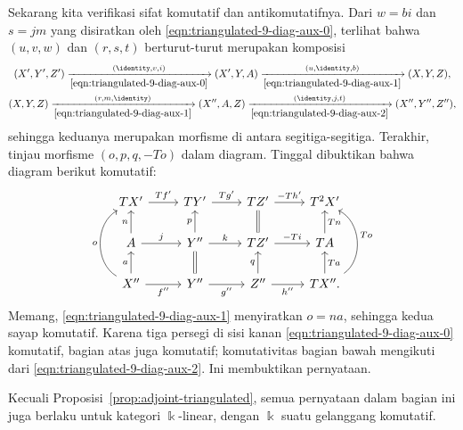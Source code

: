 \begin{bukti}
	Sekarang kita verifikasi sifat komutatif dan antikomutatifnya. Dari $w = bi$
	dan $s = jm$ yang disiratkan oleh
	\eqref{eqn:triangulated-9-diag-aux-0}, terlihat bahwa $(u, v, w)$ dan
	$(r, s, t)$ berturut-turut merupakan komposisi
	\begin{gather*}
		(X', Y', Z') \xrightarrow[\eqref{eqn:triangulated-9-diag-aux-0}]{(\identity, v, i)} (X', Y, A) \xrightarrow[\eqref{eqn:triangulated-9-diag-aux-1}]{(u, \identity, b)} (X, Y, Z), \\
		(X, Y, Z) \xrightarrow[\eqref{eqn:triangulated-9-diag-aux-1}]{(r, m, \identity)} (X'', A, Z) \xrightarrow[\eqref{eqn:triangulated-9-diag-aux-2}]{(\identity, j, t)} (X'', Y'', Z''),
	\end{gather*}
	sehingga keduanya merupakan morfisme di antara segitiga-segitiga. Terakhir,
	tinjau morfisme $(o, p, q, -To)$ dalam diagram. Tinggal dibuktikan bahwa
	diagram berikut komutatif:
	\[\begin{tikzcd}
		TX' \arrow[r, "{Tf'}"] & TY' \arrow[r, "{Tg'}"] & TZ' \arrow[r, "{- Th'}"] & T^2 X' \\
		A \arrow[u, "n"] \arrow[r, "j"] & Y'' \arrow[r, "k"] \arrow[u, "p"] & TZ' \arrow[equal, u] \arrow[r, "-Ti"] & TA \arrow[u, "Tn"'] \\
		X'' \arrow[u, "a"] \arrow[r, "{f''}"'] \arrow[bend left=60, uu, "o"] & Y'' \arrow[r, "{g''}"'] \arrow[equal, u] & Z'' \arrow[r, "{h''}"'] \arrow[u, "q"] & TX'' \arrow[u, "Ta"'] \arrow[bend right=60, uu, "To"'] .
	\end{tikzcd}\]
	Memang, \eqref{eqn:triangulated-9-diag-aux-1} menyiratkan $o = na$, sehingga
	kedua sayap komutatif. Karena tiga persegi di sisi kanan
	\eqref{eqn:triangulated-9-diag-aux-0} komutatif, bagian atas juga
	komutatif; komutativitas bagian bawah mengikuti dari
	\eqref{eqn:triangulated-9-diag-aux-2}. Ini membuktikan pernyataan.
\end{bukti}

Kecuali Proposisi~\ref{prop:adjoint-triangulated}, semua pernyataan dalam
bagian ini juga berlaku untuk kategori $\Bbbk$-linear, dengan $\Bbbk$ suatu
gelanggang komutatif.

